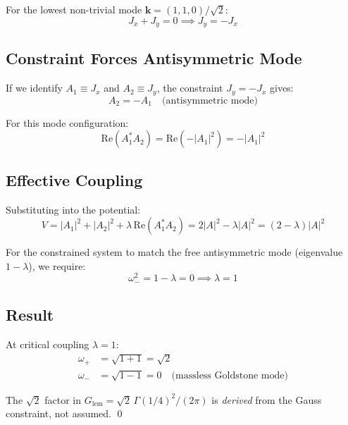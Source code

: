 \documentclass[11pt,a4paper]{article}
\theoremstyle{definition}
\theoremstyle{remark}
\newcommand{\Glem}{G_{\text{lem}}}
\begin{document}
For the lowest non-trivial mode $\mathbf{k} = (1, 1, 0)/\sqrt{2}$:
\begin{equation}
    J_x + J_y = 0 \implies J_y = -J_x
\end{equation}

\subsection*{Constraint Forces Antisymmetric Mode}

If we identify $A_1 \equiv J_x$ and $A_2 \equiv J_y$, the constraint $J_y = -J_x$ gives:
\begin{equation}
    A_2 = -A_1 \quad \text{(antisymmetric mode)}
\end{equation}

For this mode configuration:
\begin{equation}
    \text{Re}(A_1^* A_2) = \text{Re}(-|A_1|^2) = -|A_1|^2
\end{equation}

\subsection*{Effective Coupling}

Substituting into the potential:
\begin{equation}
    V = |A_1|^2 + |A_2|^2 + \lambda\,\text{Re}(A_1^* A_2) = 2|A|^2 - \lambda|A|^2 = (2 - \lambda)|A|^2
\end{equation}

For the constrained system to match the free antisymmetric mode (eigenvalue $1 - \lambda$), we require:
\begin{equation}
    \omega_-^2 = 1 - \lambda = 0 \implies \boxed{\lambda = 1}
\end{equation}

\subsection*{Result}

At critical coupling $\lambda = 1$:
\begin{align}
    \omega_+ &= \sqrt{1 + 1} = \sqrt{2} \\
    \omega_- &= \sqrt{1 - 1} = 0 \quad \text{(massless Goldstone mode)}
\end{align}

The $\sqrt{2}$ factor in $\Glem = \sqrt{2}\,\Gamma(1/4)^2/(2\pi)$ is \emph{derived} from the Gauss constraint, not assumed. \qed
\end{document}

